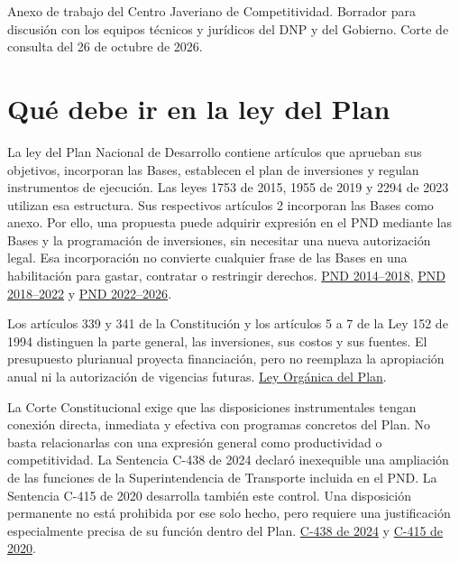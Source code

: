Anexo de trabajo del Centro Javeriano de Competitividad. Borrador para discusión con los equipos técnicos y jurídicos del DNP y del Gobierno. Corte de consulta del 26 de octubre de 2026.

\section*{Qué debe ir en la ley del Plan}

La ley del Plan Nacional de Desarrollo contiene artículos que aprueban sus objetivos, incorporan las Bases, establecen el plan de inversiones y regulan instrumentos de ejecución. Las leyes 1753 de 2015, 1955 de 2019 y 2294 de 2023 utilizan esa estructura. Sus respectivos artículos 2 incorporan las Bases como anexo. Por ello, una propuesta puede adquirir expresión en el PND mediante las Bases y la programación de inversiones, sin necesitar una nueva autorización legal. Esa incorporación no convierte cualquier frase de las Bases en una habilitación para gastar, contratar o restringir derechos. \href{https://normativa.colpensiones.gov.co/compilacion/docs/ley\_1753\_2015.htm}{PND 2014–2018}, \href{https://normativa.colpensiones.gov.co/colpens/compilacion/docs/ley\_1955\_2019.htm}{PND 2018–2022} y \href{https://normograma.mintic.gov.co/mintic/compilacion/docs/ley\_2294\_2023.htm}{PND 2022–2026}.

Los artículos 339 y 341 de la Constitución y los artículos 5 a 7 de la Ley 152 de 1994 distinguen la parte general, las inversiones, sus costos y sus fuentes. El presupuesto plurianual proyecta financiación, pero no reemplaza la apropiación anual ni la autorización de vigencias futuras. \href{https://normativa.colpensiones.gov.co/compilacion/docs/ley\_0152\_1994.htm}{Ley Orgánica del Plan}.

La Corte Constitucional exige que las disposiciones instrumentales tengan conexión directa, inmediata y efectiva con programas concretos del Plan. No basta relacionarlas con una expresión general como productividad o competitividad. La Sentencia C-438 de 2024 declaró inexequible una ampliación de las funciones de la Superintendencia de Transporte incluida en el PND. La Sentencia C-415 de 2020 desarrolla también este control. Una disposición permanente no está prohibida por ese solo hecho, pero requiere una justificación especialmente precisa de su función dentro del Plan. \href{https://www.corteconstitucional.gov.co/relatoria/2024/c-438-24.htm}{C-438 de 2024} y \href{https://www.corteconstitucional.gov.co/relatoria/2020/c-415-20.htm}{C-415 de 2020}.

